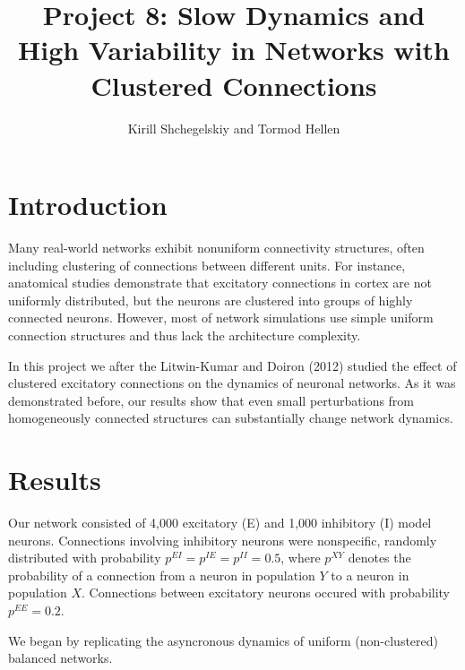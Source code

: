 \documentclass[11pt]{article}
\begin{document}
\title{Project 8: Slow Dynamics and High Variability in Networks with Clustered Connections}
\author{Kirill Shchegelskiy and Tormod Hellen}

\maketitle

\section{Introduction}

Many real-world networks exhibit nonuniform connectivity structures, often including clustering of connections between different units. For instance, anatomical studies demonstrate that excitatory connections in cortex are not uniformly distributed, but the neurons are clustered into groups of highly connected neurons. However, most of network simulations use simple uniform connection structures and thus lack the architecture complexity.

In this project we after the Litwin-Kumar and Doiron (2012) studied the effect of clustered excitatory connections on the dynamics of neuronal networks. As it was demonstrated before, our results show that even small perturbations from homogeneously connected structures can substantially change network dynamics. 

\section{Results}

Our network consisted of 4,000 excitatory (E) and 1,000 inhibitory (I) model neurons. Connections involving inhibitory neurons were nonspecific, randomly distributed with probability $p^{EI} = p^{IE} = p^{II} = 0.5$, where $p^{XY}$ denotes the probability of a connection from a neuron in population $Y$ to a neuron in population $X$. Connections between excitatory neurons occured with probability $p^{EE} = 0.2$.


We began by replicating the asyncronous dynamics of uniform (non-clustered) balanced networks.



\end{document}
